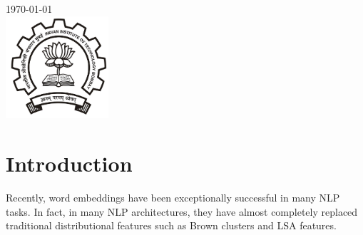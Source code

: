 \documentclass[12pt]{article}
\begin{document}
\begin{titlepage}

{\large \today}\\[2cm] %


\includegraphics[height=3.8cm,keepaspectratio]{logo.jpg}\\[0cm] %
 

\vfill %

\end{titlepage}


\tableofcontents
\pagebreak


\section{Introduction}

Recently, word embeddings have been exceptionally successful in many NLP tasks. In fact, in many NLP architectures, they have almost completely replaced traditional distributional features such as Brown clusters and LSA features.\\
\end{document}
